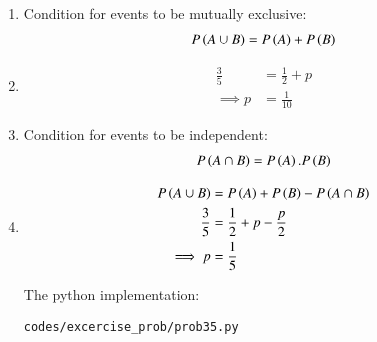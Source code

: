 \renewcommand{\theequation}{\theenumi}
\begin{enumerate}

\item Condition for events to be mutually exclusive:
\begin{align}
P\left(A \cup B\right) = P\left(A\right) + P\left(B\right)
\end{align}

\item  
\begin{align}
\frac{3}{5} &= \frac{1}{2} + p\\
\implies p &= \frac{1}{10}
\end{align}

\item Condition for events to be independent:
\begin{align}
P\left(A \cap B\right) = P\left(A\right).P\left(B\right)
\end{align}

\item  
\begin{align}
P\left(A \cup B\right) &= P\left(A\right) + P\left(B\right) - P\left(A \cap B\right)\\
\frac{3}{5} &= \frac{1}{2} + p - \frac{p}{2} \\
\implies p &= \frac{1}{5}
\end{align}

The python implementation:
\begin{lstlisting}
codes/excercise_prob/prob35.py
\end{lstlisting}


\end{enumerate}
